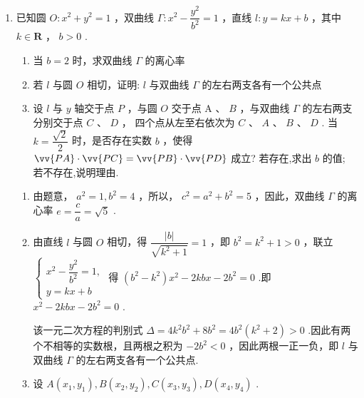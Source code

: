 \begin{enumerate}
\begin{enumerate}
\begin{jieda}
\begin{enumerate}
                $\dfrac{\lambda }{5} \in  \Omega$即$\lambda \in [5\sqrt{5}-10, +\infty)$，根据对勾函数性质可知$S \in$  $\left\lbrack  {\dfrac{{13}\sqrt{5} - {19}}{5}, + \infty }\right)$ .
            \end{enumerate}
        \end{jieda}
        \item 已知圆 $O : {x}^{2} + {y}^{2} = 1$ ，双曲线 $\Gamma  : {x}^{2} - \dfrac{{y}^{2}}{{b}^{2}} = 1$ ，直线 $l : y = {kx} + b$ ，其中 $k \in  \mathbf{R}$ ， $b > 0$ .
        \begin{enumerate}
            \item 当 $b = 2$ 时，求双曲线 $\Gamma$ 的离心率
            \item 若 $l$ 与圆 $O$ 相切，证明: $l$ 与双曲线 $\Gamma$ 的左右两支各有一个公共点
            \item 设 $l$ 与 $y$ 轴交于点 $P$ ，与圆 $O$ 交于点 $\mathrm{A}$ 、 $B$ ，与双曲线 $\Gamma$ 的左右两支分别交于点 $C$ 、 $D$ ， 四个点从左至右依次为 $C\text{ 、 }A\text{ 、 }B\text{ 、 }D$ . 当 $k = \dfrac{\sqrt{2}}{2}$ 时，是否存在实数 $b$ ，使得 $\vv{PA} \cdot  \vv{PC} = \vv{PB} \cdot  \vv{PD}$ 成立? 若存在,求出 $b$ 的值; 若不存在,说明理由.
        \end{enumerate}
        \begin{jieda}
            \begin{enumerate}
                \item 由题意， ${a}^{2} = 1,{b}^{2} = 4$ ，所以， ${c}^{2} = {a}^{2} + {b}^{2} = 5$ ，因此，双曲线 $\Gamma$ 的离心率 $e = \dfrac{c}{a} = \sqrt{5}$ .
                \item 由直线 $l$ 与圆 $O$ 相切，得 $\dfrac{\left| b\right| }{\sqrt{{k}^{2} + 1}} = 1$ ，即 ${b}^{2} = {k}^{2} + 1 > 0$ ，联立 $\left\{  \begin{array}{l} {x}^{2} - \dfrac{{y}^{2}}{{b}^{2}} = 1, \\  y = {kx} + b \end{array}\right.$ 得 $\left( {{b}^{2} - {k}^{2}}\right) {x}^{2} - {2kbx} - 2{b}^{2} = 0$ .即 ${x}^{2} - {2kbx} - 2{b}^{2} = 0$ .
                
                该一元二次方程的判别式 $\Delta  = 4{k}^{2}{b}^{2} + 8{b}^{2} = 4{b}^{2}\left( {{k}^{2} + 2}\right)  > 0$ .因此有两个不相等的实数根，且两根之积为 $- 2{b}^{2} < 0$ ，因此两根一正一负，即 $l$ 与双曲线 $\Gamma$ 的左右两支各有一个公共点.
                \item 设 $A\left( {{x}_{1},{y}_{1}}\right) ,B\left( {{x}_{2},{y}_{2}}\right) ,C\left( {{x}_{3},{y}_{3}}\right) ,D\left( {{x}_{4},{y}_{4}}\right)$ .
                

\end{enumerate}
\end{jieda}
\end{enumerate}
\end{enumerate}
